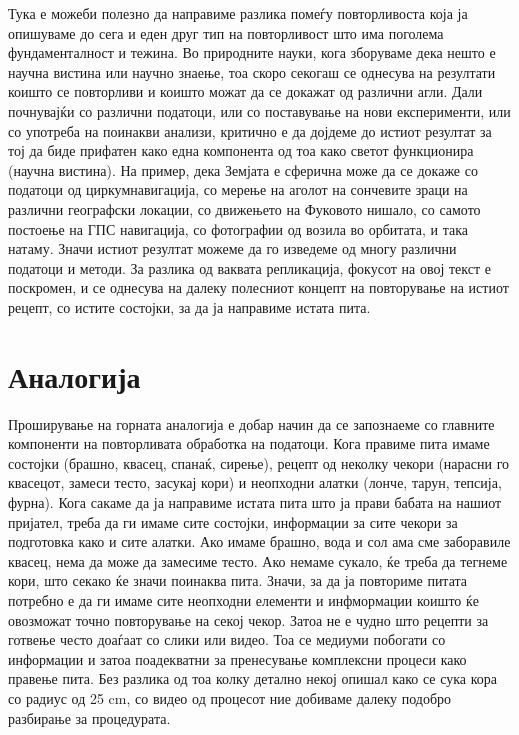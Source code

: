 \documentclass[
]{book}
\begin{document}
Тука е можеби полезно да направиме разлика помеѓу повторливоста која ја опишуваме до сега и еден друг тип на повторливост што има поголема фундаменталност и тежина. Во природните науки, кога зборуваме дека нешто е научна вистина или научно знаење, тоа скоро секогаш се однесува на резултати коишто се повторливи и коишто можат да се докажат од различни агли. Дали почнувајќи со различни податоци, или со поставување на нови експерименти, или со употреба на поинакви анализи, критично е да дојдеме до истиот резултат за тој да биде прифатен како една компонента од тоа како светот функционира (научна вистина). На пример, дека Земјата е сферична може да се докаже со податоци од циркумнавигација, со мерење на аголот на сончевите зраци на различни географски локации, со движењето на Фуковото нишало, со самото постоење на ГПС навигација, со фотографии од возила во орбитата, и така натаму. Значи истиот резултат можеме да го изведеме од многу различни податоци и методи. За разлика од ваквата репликација, фокусот на овој текст е поскромен, и се однесува на далеку полесниот концепт на повторување на истиот рецепт, со истите состојки, за да ја направиме истата пита.

\hypertarget{analogy}{%
\section{Аналогија}\label{analogy}}

Проширување на горната аналогија е добар начин да се запознаеме со главните компоненти на повторливата обработка на податоци. Кога правиме пита имаме состојки (брашно, квасец, спанаќ, сирење), рецепт од неколку чекори (нарасни го квасецот, замеси тесто, засукај кори) и неопходни алатки (лонче, тарун, тепсија, фурна). Кога сакаме да ја направиме истата пита што ја прави бабата на нашиот пријател, треба да ги имаме сите состојки, информации за сите чекори за подготовка како и сите алатки. Ако имаме брашно, вода и сол ама сме заборавиле квасец, нема да може да замесиме тесто. Ако немаме сукало, ќе треба да тегнеме кори, што секако ќе значи поинаква пита. Значи, за да ја повториме питата потребно е да ги имаме сите неопходни елементи и инфмормации коишто ќе овозможат точно повторување на секој чекор. Затоа не е чудно што рецепти за готвење често доаѓаат со слики или видео. Тоа се медиуми побогати со информации и затоа поадекватни за пренесување комплексни процеси како правење пита. Без разлика од тоа колку детално некој опишал како се сука кора со радиус од 25 cm, со видео од процесот ние добиваме далеку подобро разбирање за процедурата.
\end{document}

